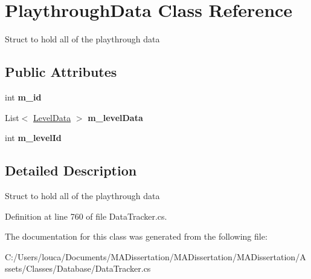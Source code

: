 \hypertarget{class_playthrough_data}{}\section{Playthrough\+Data Class Reference}
\label{class_playthrough_data}


Struct to hold all of the playthrough data  


\subsection*{Public Attributes}
\begin{DoxyCompactItemize}
\item 
\mbox{\label{class_playthrough_data_a32c9d72f156f0a9d3a66d05d65f25b21}} 
int {\bfseries m\+\_\+id}
\item 
\mbox{\label{class_playthrough_data_ab4aa6fa0bf0be59b6ee6ef5096fdb1af}} 
List$<$ \mbox{\hyperlink{class_level_data}{Level\+Data}} $>$ {\bfseries m\+\_\+level\+Data}
\item 
\mbox{\label{class_playthrough_data_afc0d6416b3a39980a610195c9bf26009}} 
int {\bfseries m\+\_\+level\+Id}
\end{DoxyCompactItemize}


\subsection{Detailed Description}
Struct to hold all of the playthrough data 



Definition at line 760 of file Data\+Tracker.\+cs.



The documentation for this class was generated from the following file\+:\begin{DoxyCompactItemize}
\item 
C\+:/\+Users/louca/\+Documents/\+M\+A\+Dissertation/\+M\+A\+Dissertation/\+M\+A\+Dissertation/\+Assets/\+Classes/\+Database/Data\+Tracker.\+cs\end{DoxyCompactItemize}
